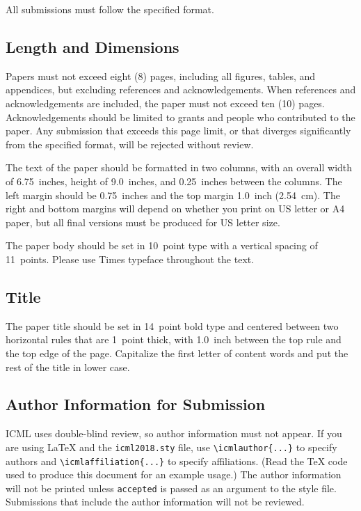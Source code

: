 \documentclass{article}
\begin{document}
All submissions must follow the specified format.

\subsection{Length and Dimensions}

Papers must not exceed eight (8) pages, including all figures, tables,
and appendices, but excluding references and acknowledgements. When references and acknowledgements are included,
the paper must not exceed ten (10) pages.
Acknowledgements should be limited to grants and people who contributed to the paper.
Any submission that exceeds
this page limit, or that diverges significantly from the specified format,
will be rejected without review.

The text of the paper should be formatted in two columns, with an
overall width of 6.75~inches, height of 9.0~inches, and 0.25~inches
between the columns. The left margin should be 0.75~inches and the top
margin 1.0~inch (2.54~cm). The right and bottom margins will depend on
whether you print on US letter or A4 paper, but all final versions
must be produced for US letter size.

The paper body should be set in 10~point type with a vertical spacing
of 11~points. Please use Times typeface throughout the text.

\subsection{Title}

The paper title should be set in 14~point bold type and centered
between two horizontal rules that are 1~point thick, with 1.0~inch
between the top rule and the top edge of the page. Capitalize the
first letter of content words and put the rest of the title in lower
case.

\subsection{Author Information for Submission}
\label{author info}

ICML uses double-blind review, so author information must not appear. If
you are using \LaTeX\/ and the \texttt{icml2018.sty} file, use
\verb+\icmlauthor{...}+ to specify authors and \verb+\icmlaffiliation{...}+ to specify affiliations. (Read the TeX code used to produce this document for an example usage.) The author information
will not be printed unless \texttt{accepted} is passed as an argument to the
style file.
Submissions that include the author information will not
be reviewed.
\end{document}
